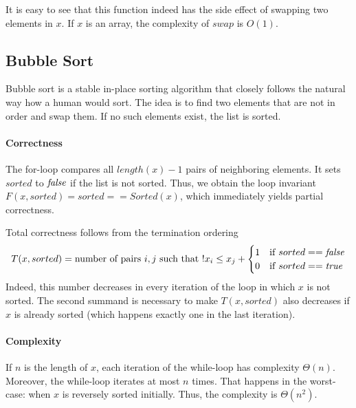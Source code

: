 It is easy to see that this function indeed has the side effect of swapping two elements in $x$.
If $x$ is an array, the complexity of $swap$ is $O(1)$.


\subsection{Bubble Sort}

Bubble sort is a stable in-place sorting algorithm that closely follows the natural way how a human would sort.
The idea is to find two elements that are not in order and swap them.
If no such elements exist, the list is sorted.

\begin{acode}
\end{acode}

\paragraph{Correctness}
The for-loop compares all $length(x)-1$ pairs of neighboring elements.
It sets $sorted$ to $\mathit{false}$ if the list is not sorted.
Thus, we obtain the loop invariant $F(x,sorted)=sorted==Sorted(x)$, which immediately yields partial correctness.

Total correctness follows from the termination ordering
 \[T(x,sorted)=\text{number of pairs $i,j$ such that $! x_i\leq x_j$} + \begin{cases}1&\mathrm{if}\; sorted==\mathit{false}\\ 0&\mathrm{if}\; sorted==\mathit{true}\end{cases}\]
Indeed, this number decreases in every iteration of the loop in which $x$ is not sorted.
The second summand is necessary to make $T(x,sorted)$ also decreases if $x$ is already sorted (which happens exactly one in the last iteration).

\paragraph{Complexity}
If $n$ is the length of $x$, each iteration of the while-loop has complexity $\Theta(n)$.
Moreover, the while-loop iterates at most $n$ times.
That happens in the worst-case: when $x$ is reversely sorted initially.
Thus, the complexity is $\Theta(n^2)$.

